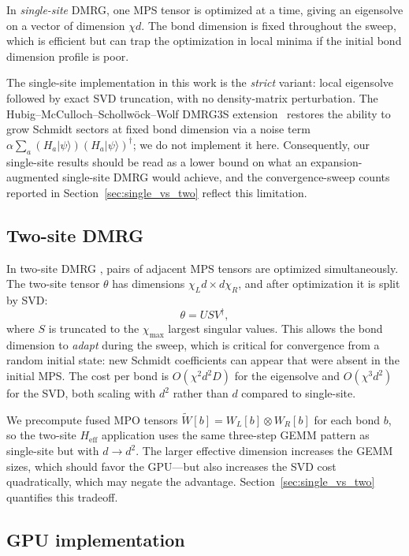 \documentclass[preprint,12pt]{elsarticle}
\begin{document}
In \emph{single-site} DMRG, one MPS tensor is optimized at a time, giving an eigensolve on a vector of dimension $\chi d$.
The bond dimension is fixed throughout the sweep, which is efficient but can trap the optimization in local minima if the initial bond dimension profile is poor.

The single-site implementation in this work is the \emph{strict} variant: local eigensolve followed by exact SVD truncation, with no density-matrix perturbation.
The Hubig--McCulloch--Schollw{\"o}ck--Wolf DMRG3S extension~\cite{Hubig2015} restores the ability to grow Schmidt sectors at fixed bond dimension via a noise term $\alpha \sum_a (H_a|\psi\rangle)(H_a|\psi\rangle)^\dagger$; we do not implement it here.
Consequently, our single-site results should be read as a lower bound on what an expansion-augmented single-site DMRG would achieve, and the convergence-sweep counts reported in Section~\ref{sec:single_vs_two} reflect this limitation.

\subsection{Two-site DMRG}
\label{sec:two_site}

In two-site DMRG \cite{White2005}, pairs of adjacent MPS tensors are optimized simultaneously.
The two-site tensor $\theta$ has dimensions $\chi_L d \times d \chi_R$, and after optimization it is split by SVD:
\begin{equation}
  \theta = U S V^\dagger,
\end{equation}
where $S$ is truncated to the $\chi_\text{max}$ largest singular values.
This allows the bond dimension to \emph{adapt} during the sweep, which is critical for convergence from a random initial state: new Schmidt coefficients can appear that were absent in the initial MPS.
The cost per bond is $O(\chi^2 d^2 D)$ for the eigensolve and $O(\chi^3 d^2)$ for the SVD, both scaling with $d^2$ rather than $d$ compared to single-site.

We precompute fused MPO tensors $\widetilde{W}[b] = W_L[b] \otimes W_R[b]$ for each bond $b$, so the two-site $H_\text{eff}$ application uses the same three-step GEMM pattern as single-site but with $d \to d^2$.
The larger effective dimension increases the GEMM sizes, which should favor the GPU---but also increases the SVD cost quadratically, which may negate the advantage.
Section~\ref{sec:single_vs_two} quantifies this tradeoff.

\subsection{GPU implementation}
\label{sec:gpu_impl}
\end{document}
